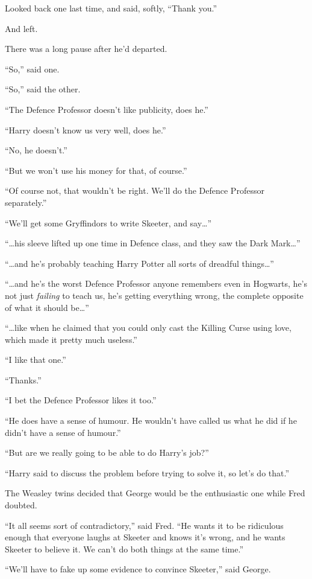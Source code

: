 Looked back one last time, and said, softly, ``Thank you.''

And left.

There was a long pause after he'd departed.

``So,'' said one.

``So,'' said the other.

``The Defence Professor doesn't like publicity, does he.''

``Harry doesn't know us very well, does he.''

``No, he doesn't.''

``But we won't use his money for that, of course.''

``Of course not, that wouldn't be right. We'll do the Defence Professor
separately.''

``We'll get some Gryffindors to write Skeeter, and say\ldots{}''

``\ldots{}his sleeve lifted up one time in Defence class, and they saw
the Dark Mark\ldots{}''

``\ldots{}and he's probably teaching Harry Potter all sorts of dreadful
things\ldots{}''

``\ldots{}and he's the worst Defence Professor anyone remembers even in
Hogwarts, he's not just \emph{failing} to teach us, he's getting
everything wrong, the complete opposite of what it should be\ldots{}''

``\ldots{}like when he claimed that you could only cast the Killing
Curse using love, which made it pretty much useless.''

``I like that one.''

``Thanks.''

``I bet the Defence Professor likes it too.''

``He does have a sense of humour. He wouldn't have called us what he did
if he didn't have a sense of humour.''

``But are we really going to be able to do Harry's job?''

``Harry said to discuss the problem before trying to solve it, so let's
do that.''

The Weasley twins decided that George would be the enthusiastic one
while Fred doubted.

``It all seems sort of contradictory,'' said Fred. ``He wants it to be
ridiculous enough that everyone laughs at Skeeter and knows it's wrong,
and he wants Skeeter to believe it. We can't do both things at the same
time.''

``We'll have to fake up some evidence to convince Skeeter,'' said
George.

